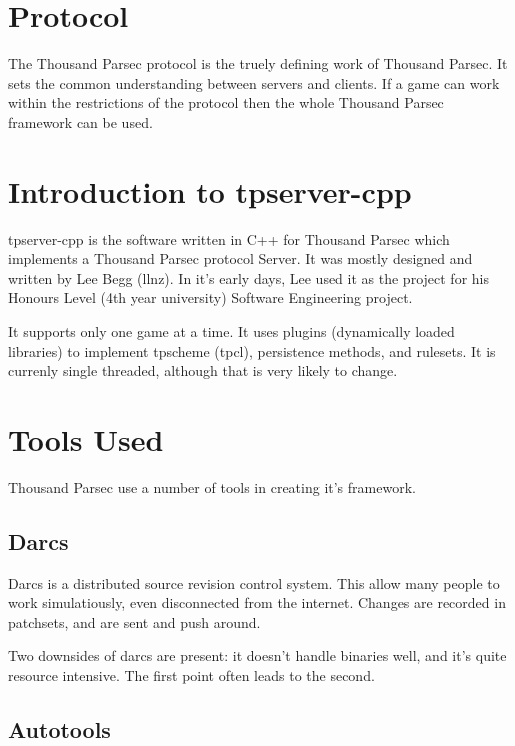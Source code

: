 \documentclass[a4paper,11pt]{report}
\begin{document}
\chapter{Protocol}
\label{chap:protocol-intro}

The Thousand Parsec protocol is the truely defining work of Thousand Parsec. It sets the common understanding between servers and clients. If a game can work within the restrictions of the protocol then the whole Thousand Parsec framework can be used.

\chapter{Introduction to tpserver-cpp}
\label{chap:tpserver-cpp-intro}
tpserver-cpp is the software written in C++ for Thousand Parsec which implements a Thousand Parsec protocol Server. It was mostly designed and written by Lee Begg (llnz). In it's early days, Lee used it as the project for his Honours Level (4th year university) Software Engineering project.

It supports only one game at a time. It uses plugins (dynamically loaded libraries) to implement tpscheme (tpcl), persistence methods, and rulesets. It is currenly single threaded, although that is very likely to change.

\chapter{Tools Used}
\label{chap:tools}

Thousand Parsec use a number of tools in creating it's framework.

\section{Darcs}
\label{sec:darcs}

Darcs is a distributed source revision control system. This allow many people to work simulatiously, even disconnected from the internet. Changes are recorded in patchsets, and are sent and push around.

Two downsides of darcs are present: it doesn't handle binaries well, and it's quite resource intensive. The first point often leads to the second.

\section{Autotools}
\label{sec:autotools}
\end{document}
